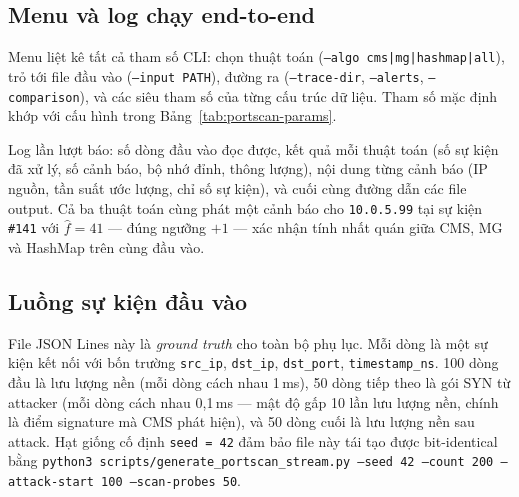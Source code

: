 \subsection{Menu và log chạy end-to-end}
\label{sec:trace:portscan-menu}



\noindent Menu liệt kê tất cả tham số CLI: chọn thuật toán
(\texttt{--algo cms|mg|hashmap|all}), trỏ tới file đầu vào
(\texttt{--input PATH}), đường ra (\texttt{--trace-dir},
\texttt{--alerts}, \texttt{--comparison}), và các siêu tham số của từng cấu
trúc dữ liệu. Tham số mặc định khớp với cấu hình trong
Bảng~\ref{tab:portscan-params}.



\noindent Log lần lượt báo: số dòng đầu vào đọc được, kết quả mỗi thuật toán
(số sự kiện đã xử lý, số cảnh báo, bộ nhớ đỉnh, thông lượng), nội dung từng
cảnh báo (IP nguồn, tần suất ước lượng, chỉ số sự kiện), và cuối cùng đường
dẫn các file output. Cả ba thuật toán cùng phát một cảnh báo cho
\texttt{10.0.5.99} tại sự kiện \texttt{\#141} với
$\hat f = 41$ --- đúng ngưỡng $+1$ --- xác nhận tính nhất quán giữa CMS, MG
và HashMap trên cùng đầu vào.

\subsection{Luồng sự kiện đầu vào}
\label{sec:trace:portscan-stream}



\noindent File JSON Lines này là \emph{ground truth} cho toàn bộ phụ lục.
Mỗi dòng là một sự kiện kết nối với bốn trường \texttt{src\_ip},
\texttt{dst\_ip}, \texttt{dst\_port}, \texttt{timestamp\_ns}. 100 dòng đầu là
lưu lượng nền (mỗi dòng cách nhau 1\,ms), 50 dòng tiếp theo là gói SYN từ
attacker (mỗi dòng cách nhau 0{,}1\,ms --- mật độ gấp 10 lần lưu lượng nền,
chính là điểm signature mà CMS phát hiện), và 50 dòng cuối là lưu lượng nền
sau attack. Hạt giống cố định \texttt{seed = 42} đảm bảo file này tái tạo
được bit-identical bằng \texttt{python3 scripts/generate\_portscan\_stream.py
--seed 42 --count 200 --attack-start 100 --scan-probes 50}.

